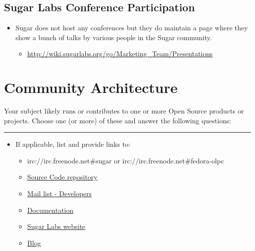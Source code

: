 \subsection{Sugar Labs Conference
Participation}\label{sugar-labs-conference-participation}

\begin{itemize}
\itemsep1pt\parskip0pt
\item
  Sugar does not host any conferences but they do maintain a page where
  they show a bunch of talks by various people in the Sugar community.

  \begin{itemize}
  \itemsep1pt\parskip0pt
  \item
    \url{http://wiki.sugarlabs.org/go/Marketing_Team/Presentations}
  \end{itemize}
\end{itemize}

\section{Community Architecture}\label{community-architecture}

Your subject likely runs or contributes to one or more Open Source
products or projects. Choose one (or more) of these and answer the
following questions:

\begin{center}\rule{3in}{0.4pt}\end{center}

\begin{itemize}
\itemsep1pt\parskip0pt
\item
  If applicable, list and provide links to:

  \begin{itemize}
  \itemsep1pt\parskip0pt
  \item
    irc://irc.freenode.net\#sugar or irc://irc.freenode.net\#fedora-olpc
  \item
    \href{https://github.com/sugarlabs/sugar}{Source Code repository}
  \item
    \href{http://lists.sugarlabs.org/listinfo/sugar-devel}{Mail list -
    Developers}
  \item
    \href{http://wiki.sugarlabs.org/go/Welcome_to_the_Sugar_Labs_wiki}{Documentation}
  \item
    \href{https://www.sugarlabs.org/}{Sugar Labs website}
  \item
    \href{http://planet.sugarlabs.org/}{Blog}
  \end{itemize}
\end{itemize}

